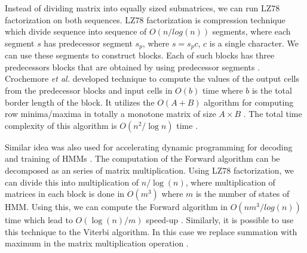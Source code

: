 Instead of dividing matrix into equally sized submatrices, we can run LZ78
factorization \cite{Lempel1976} on both sequences.  LZ78 factorization is
compression technique which divide sequence into sequence of $O(n/log(n))$
segments, where each segment $s$ has predecessor segment $s_p$, where $s=s_pc$,
$c$ is a single character. We can use these segments to construct blocks. Each
of such blocks has three predecessors blocks that are obtained by using
predecessor segments \cite{Crochemore2002}. Crochemore {\it et al.} developed
technique to compute the values of the output cells from the predecessor blocks
and input cells in $O(b)$ time where $b$ is the total border length of the
block. It utilizes the $O(A+B)$ algorithm for computing row minima/maxima in
totally a monotone matrix of size $A\times B$ \cite{Aggarwal1987}.  The total
time complexity of this algorithm is $O(n^2/\log n)$ time
\cite{Crochemore2002}.

Similar idea was also used for accelerating dynamic programming for decoding
and training of HMMs \cite{Weimann2009}. The computation of the Forward
algorithm can be decomposed as an series of matrix multiplication. Using LZ78
factorization, we can divide this into multiplication of $n/\log(n)$, where
multiplication of matrices in each block is done in $O(m^3)$ where $m$ is the
number of states of HMM. Using this, we can compute the Forward algorithm in
$O(nm^3/log(n))$ time which lead to $O(\log(n)/m)$ speed-up \cite{Weimann2009}.
Similarly, it is possible to use this technique to the Viterbi algorithm. In
this case we replace summation with maximum in the matrix multiplication
operation \cite{Weimann2009}.
